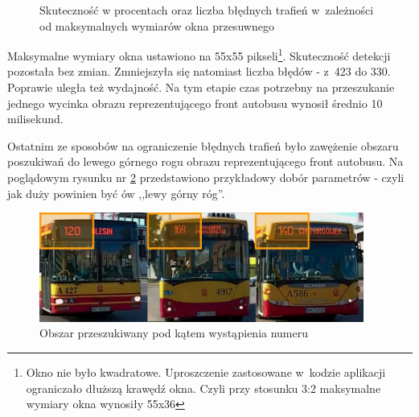 \begin{figure}[h!]\centering
	\begin{subfigure}{.49\linewidth}\centering
	\end{subfigure}	
	\hfill
	\begin{subfigure}{.49\linewidth}\centering
	\end{subfigure}
	\caption{Skuteczność w procentach oraz liczba błędnych trafień 
		w~zależności od maksymalnych wymiarów okna przesuwnego}
	\label{chart:front_max2ratio}
\end{figure}

Maksymalne wymiary okna ustawiono na 55x55 pikseli\footnote{Okno nie było
	kwadratowe. Uproszczenie zastosowane w~kodzie aplikacji ograniczało dłuższą krawędź
	okna. Czyli przy stosunku 3:2 maksymalne wymiary okna wynosiły 55x36}. Skuteczność detekcji pozostała
bez zmian. Zmniejszyła się natomiast liczba błędów - z~423 do 330. Poprawie
uległa też wydajność. 
Na tym etapie czas potrzebny na przeszukanie jednego wycinka obrazu
reprezentującego front autobusu wynosił średnio 10 milisekund.

Ostatnim ze sposobów na ograniczenie błędnych trafień było zawężenie
obszaru poszukiwań do lewego górnego rogu obrazu reprezentującego
front autobusu. Na poglądowym rysunku nr \ref{fig:frontupperleft} przedstawiono
przykładowy dobór parametrów - czyli jak duży powinien być ów ,,lewy górny róg''.

\begin{figure}[!h]
    \centering
    \includegraphics[width=0.95\textwidth]{img/exp_front_upper_left}
    \caption{Obszar przeszukiwany pod kątem wystąpienia numeru}
    \label{fig:frontupperleft}
\end{figure}

